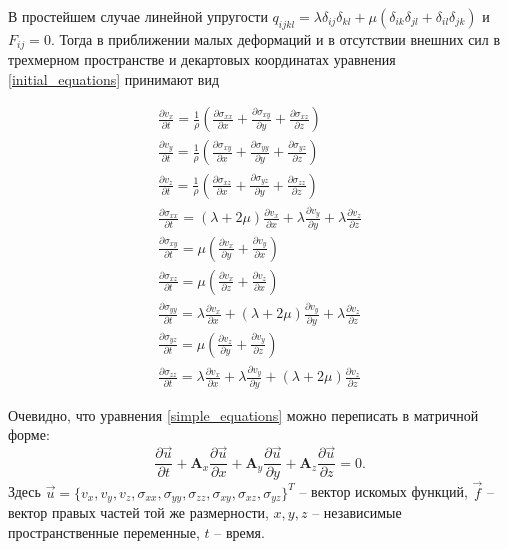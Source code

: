 В простейшем случае линейной упругости $q_{ijkl}=\lambda\delta_{ij}\delta_{kl}+\mu(\delta_{ik}\delta_{jl}+\delta_{il}\delta_{jk})$ и $F_{ij}=0$. Тогда в приближении малых деформаций и в отсутствии внешних сил в трехмерном пространстве и декартовых координатах уравнения \ref{initial_equations} принимают вид

\begin{eqnarray}
\label{simple_equations}
\frac{\partial{v_x}}{\partial{t}}=\frac{1}{\rho}(\frac{\partial{\sigma_{xx}}}{\partial{x}}+\frac{\partial{\sigma_{xy}}}{\partial{y}}+\frac{\partial{\sigma_{xz}}}{\partial{z}})
\nonumber\\
\frac{\partial{v_y}}{\partial{t}}=\frac{1}{\rho}(\frac{\partial{\sigma_{xy}}}{\partial{x}}+\frac{\partial{\sigma_{yy}}}{\partial{y}}+\frac{\partial{\sigma_{yz}}}{\partial{z}})
\nonumber\\
\frac{\partial{v_z}}{\partial{t}}=\frac{1}{\rho}(\frac{\partial{\sigma_{xz}}}{\partial{x}}+\frac{\partial{\sigma_{yz}}}{\partial{y}}+\frac{\partial{\sigma_{zz}}}{\partial{z}})
\nonumber\\
\frac{\partial{\sigma_{xx}}}{\partial{t}}=(\lambda+2\mu)\frac{\partial{v_x}}{\partial{x}}+\lambda\frac{\partial{v_y}}{\partial{y}}+\lambda\frac{\partial{v_z}}{\partial{z}}
\nonumber\\
\frac{\partial{\sigma_{xy}}}{\partial{t}}=\mu(\frac{\partial{v_x}}{\partial{y}}+\frac{\partial{v_y}}{\partial{x}})
\nonumber\\
\frac{\partial{\sigma_{xz}}}{\partial{t}}=\mu(\frac{\partial{v_x}}{\partial{z}}+\frac{\partial{v_z}}{\partial{x}})
\nonumber\\
\frac{\partial{\sigma_{yy}}}{\partial{t}}=\lambda\frac{\partial{v_x}}{\partial{x}}+(\lambda+2\mu)\frac{\partial{v_y}}{\partial{y}}+\lambda\frac{\partial{v_z}}{\partial{z}}
\nonumber\\
\frac{\partial{\sigma_{yz}}}{\partial{t}}=\mu(\frac{\partial{v_z}}{\partial{y}}+\frac{\partial{v_y}}{\partial{z}})
\nonumber\\
\frac{\partial{\sigma_{zz}}}{\partial{t}}=\lambda\frac{\partial{v_x}}{\partial{x}}+\lambda\frac{\partial{v_y}}{\partial{y}}+(\lambda+2\mu)\frac{\partial{v_z}}{\partial{z}}
\end{eqnarray}

Очевидно, что уравнения \ref{simple_equations} можно переписать в матричной форме:
\begin{equation}
\label{simple_matrix_equation}
\frac{\partial\vec{u}}{\partial{t}}+\mathbf{A}_x\frac{\partial\vec{u}}{\partial{x}}+
\mathbf{A}_y\frac{\partial\vec{u}}{\partial{y}}+
\mathbf{A}_z\frac{\partial\vec{u}}{\partial{z}}=0.
\end{equation}
Здесь
$\vec{u}=\{v_x,v_y,v_z,\sigma_{xx},\sigma_{yy},\sigma_{zz},\sigma_{xy},\sigma_{xz},\sigma_{yz}\}^T$
-- вектор искомых функций, $\vec{f}$ -- вектор правых частей той же размерности,
$x,y,z$ --  независимые пространственные переменные, $t$ -- время.

